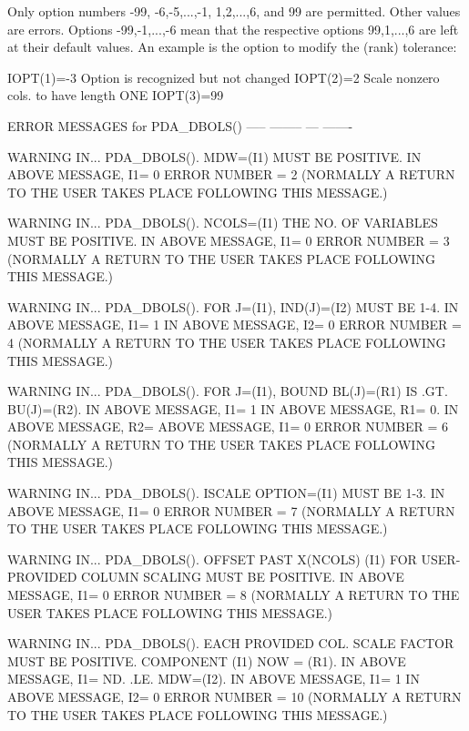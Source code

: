 \documentclass[11pt,twoside,nolof]{starlink}
\begin{document}
\begin{terminalv}
     Only option numbers -99, -6,-5,...,-1, 1,2,...,6, and 99 are
     permitted. Other values are errors. Options -99,-1,...,-6 mean
     that the respective options 99,1,...,6 are left at their default
     values. An example is the option to modify the (rank) tolerance:

       IOPT(1)=-3 Option is recognized but not changed
       IOPT(2)=2  Scale nonzero cols. to have length ONE
       IOPT(3)=99

    ERROR MESSAGES for PDA_DBOLS()
    ----- -------- --- -------

 WARNING IN...
 PDA_DBOLS(). MDW=(I1) MUST BE POSITIVE.
           IN ABOVE MESSAGE, I1=         0
 ERROR NUMBER =         2
 (NORMALLY A RETURN TO THE USER TAKES PLACE FOLLOWING THIS MESSAGE.)

 WARNING IN...
 PDA_DBOLS(). NCOLS=(I1) THE NO. OF VARIABLES MUST BE POSITIVE.
           IN ABOVE MESSAGE, I1=         0
 ERROR NUMBER =         3
 (NORMALLY A RETURN TO THE USER TAKES PLACE FOLLOWING THIS MESSAGE.)

 WARNING IN...
 PDA_DBOLS(). FOR J=(I1), IND(J)=(I2) MUST BE 1-4.
           IN ABOVE MESSAGE, I1=         1
           IN ABOVE MESSAGE, I2=         0
 ERROR NUMBER =         4
 (NORMALLY A RETURN TO THE USER TAKES PLACE FOLLOWING THIS MESSAGE.)

 WARNING IN...
 PDA_DBOLS(). FOR J=(I1), BOUND BL(J)=(R1) IS .GT. BU(J)=(R2).
           IN ABOVE MESSAGE, I1=         1
           IN ABOVE MESSAGE, R1=    0.
           IN ABOVE MESSAGE, R2=    ABOVE MESSAGE, I1=         0
 ERROR NUMBER =         6
 (NORMALLY A RETURN TO THE USER TAKES PLACE FOLLOWING THIS MESSAGE.)

 WARNING IN...
 PDA_DBOLS(). ISCALE OPTION=(I1) MUST BE 1-3.
           IN ABOVE MESSAGE, I1=         0
 ERROR NUMBER =         7
 (NORMALLY A RETURN TO THE USER TAKES PLACE FOLLOWING THIS MESSAGE.)

 WARNING IN...
 PDA_DBOLS(). OFFSET PAST X(NCOLS) (I1) FOR USER-PROVIDED  COLUMN SCALING
 MUST BE POSITIVE.
           IN ABOVE MESSAGE, I1=         0
 ERROR NUMBER =         8
 (NORMALLY A RETURN TO THE USER TAKES PLACE FOLLOWING THIS MESSAGE.)

 WARNING IN...
 PDA_DBOLS(). EACH PROVIDED COL. SCALE FACTOR MUST BE POSITIVE.
 COMPONENT (I1) NOW = (R1).
           IN ABOVE MESSAGE, I1=        ND. .LE. MDW=(I2).
           IN ABOVE MESSAGE, I1=         1
           IN ABOVE MESSAGE, I2=         0
 ERROR NUMBER =        10
 (NORMALLY A RETURN TO THE USER TAKES PLACE FOLLOWING THIS MESSAGE.)


\end{terminalv}
\end{document}

